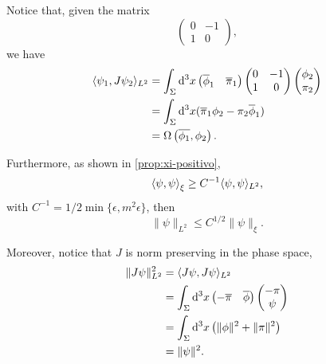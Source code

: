 Notice that, given the matrix
\begin{equation}
    \begin{pmatrix}
        0&-1\\
        1&0
    \end{pmatrix},
\end{equation}
we have
\begin{subequations}
    \begin{align}
        \langle\psi_1,J\psi_2\rangle_{L^2}&=\int_{\Sigma}\mathrm{d}^3x
        \begin{pmatrix}
            \overline{\phi}_1&\overline{\pi}_1
        \end{pmatrix}
        \begin{pmatrix}
            0&-1\\
            1&0
        \end{pmatrix}
        \begin{pmatrix}
            \phi_2\\
            \pi_2
        \end{pmatrix}\\
        &=\int_{\Sigma}\mathrm{d}^3x(\overline{\pi}_1\phi_2-\pi_2\overline{\phi}_1)\\
        &=\Omega\left(\overline{\phi_1},\phi_2\right).
    \end{align}
\end{subequations}

Furthermore, as shown in \cref{prop:xi-positivo},
\begin{equation}
    \left\langle \psi,\psi\right\rangle_{\xi}\geq C^{-1}\langle\psi,\psi\rangle_{L^2},
\end{equation}
with \(C^{-1}=1/2\min{\{\epsilon,m^2\epsilon\}}\), then
\begin{equation}
    \lVert\psi\rVert_{L^2}\leq C^{1/2}\lVert\psi\rVert_{\xi}.
\end{equation}

Moreover, notice that \(J\) is norm preserving in the phase space,
\begin{subequations}
    \begin{align}
        \lVert J\psi\rVert^2_{L^2}&=\langle J\psi,J\psi\rangle_{L^2}\\
        &=\int_{\Sigma}\mathrm{d}^3x
        \begin{pmatrix}
            -\overline{\pi}&\overline{\phi}
        \end{pmatrix}
        \begin{pmatrix}
            -\pi\\
            \psi
        \end{pmatrix}\\
        &=\int_{\Sigma}\mathrm{d}^3x\left(\lVert\phi\rVert^2+\lVert\pi\rVert^2\right)\\
        &=\lVert\psi\rVert^2.
    \end{align}
\end{subequations}

